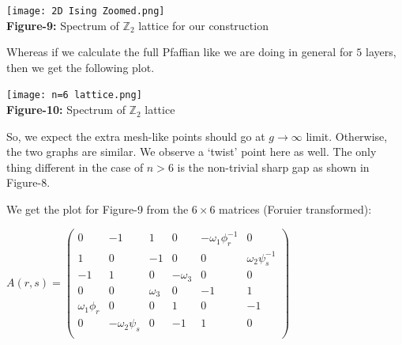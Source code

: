 \documentclass{article}
\begin{document}
	\begin{center}
		\texttt{[image: 2D Ising Zoomed.png]}\\
		\textbf{Figure-9:} Spectrum of $\mathbb{Z}_2$ lattice for our construction
	\end{center}
	
	Whereas if we calculate the full Pfaffian like we are doing in general for $5$ layers, then we get the following plot.\\
	
	\begin{center}
		\texttt{[image: n=6 lattice.png]}\\
		\textbf{Figure-10:} Spectrum of $\mathbb{Z}_2$ lattice\\
	\end{center}
	
	So, we expect the extra mesh-like points should go at $g \to \infty$ limit. Otherwise, the two graphs are similar. We observe a `twist' point here as well. The only thing different in the case of $n>6$ is the non-trivial sharp gap as shown in Figure-8.\\
	\vspace{0.5 cm}

	We get the plot for Figure-9 from the $6 \times 6$ matrices (Foruier transformed):  
	\begin{center}
		$A(r,s)=\begin{pmatrix}
			0 & -1 & 1 & 0 & -\omega_1 \phi_r^{-1} & 0\\
			1 &0&-1&0&0&\omega_2 \psi_s^{-1}\\
			-1&1&0&-\omega_3&0&0\\
			0&0&\omega_3&0&-1&1\\
			\omega_1 \phi_r&0&0&1&0&-1\\
			0&-\omega_2 \psi_s&0&-1&1&0\\
		\end{pmatrix}$\\
	\end{center}
	
	\vspace{0.2 cm}
	
\end{document}
